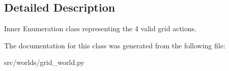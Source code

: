 \subsection{Detailed Description}
Inner Enumeration class representing the 4 valid grid actions. 

The documentation for this class was generated from the following file\+:\begin{DoxyCompactItemize}
\item 
src/worlds/grid\+\_\+world.\+py\end{DoxyCompactItemize}
